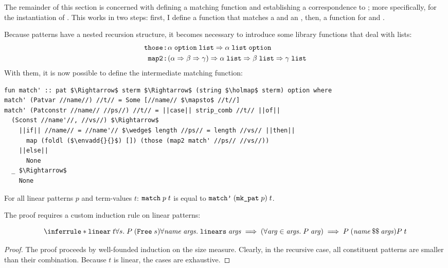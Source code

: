 
\noindent
The remainder of this section is concerned with defining a matching function and establishing a correspondence to ; more specifically, for the  instantiation of .
This works in two steps:
first, I define a function that matches a  and an ,
then, a function for  and .

Because patterns have a nested recursion structure, it becomes necessary to introduce some library functions that deal with lists:
\begin{align*}
  \texttt{\textup{those}}& \mathbin{:\!\!:} \alpha\;\texttt{\textup{option}}\;\texttt{\textup{list}} \Rightarrow \alpha\;\texttt{\textup{list}}\;\texttt{\textup{option}} \\
  \texttt{\textup{map2}}& \mathbin{:\!\!:} (\alpha \Rightarrow \beta \Rightarrow \gamma) \Rightarrow \alpha\;\texttt{\textup{list}} \Rightarrow \beta\;\texttt{\textup{list}} \Rightarrow \gamma\;\texttt{\textup{list}}
\end{align*}
%
With them, it is now possible to define the intermediate matching function:
%
\begin{lstlisting}
fun match' :: pat $\Rightarrow$ sterm $\Rightarrow$ (string $\holmap$ sterm) option where
match' (Patvar //name//) //t// = Some [//name// $\mapsto$ //t//]
match' (Patconstr //name// //ps//) //t// = ||case|| strip_comb //t// ||of||
  (Sconst //name'//, //vs//) $\Rightarrow$
    ||if|| //name// = //name'// $\wedge$ length //ps// = length //vs// ||then||
      map (foldl ($\envadd{}{}$) []) (those (map2 match' //ps// //vs//))
    ||else||
      None
  _ $\Rightarrow$
    None
\end{lstlisting}
%
\begin{lemma}\label{thm:terms:types:pat:eq}
  For all linear patterns $p$ and term-values $t$: $\texttt{\textup{match}}\;p\;t$ is equal to $\texttt{\textup{match'}}\allowbreak\;(\texttt{\textup{mk\_pat}}\allowbreak\;p)\allowbreak\;t$.
\end{lemma}

\noindent
The proof requires a custom induction rule on linear patterns:
%
\begin{lemma}
  \[
    \inferrule*{
      \holconst{linear}\;t \\
      \forall s.\; P\;(\holconst{Free}\;s) \\
      \forall \mathit{name}\;\mathit{args}.\; \holconst{linears}\;\mathit{args} \implies (\forall \mathit{arg} \in \mathit{args}.\; P\;\mathit{arg}) \implies P\;(\listcomb{\mathit{name}}{\mathit{args}})
    }{P\;t}
  \]
\end{lemma}
%
\begin{proof}
  The proof proceeds by well-founded induction on the size measure.
  Clearly, in the recursive case, all constituent patterns are smaller than their combination.
  Because $t$ is linear, the cases are exhaustive.
\end{proof}

